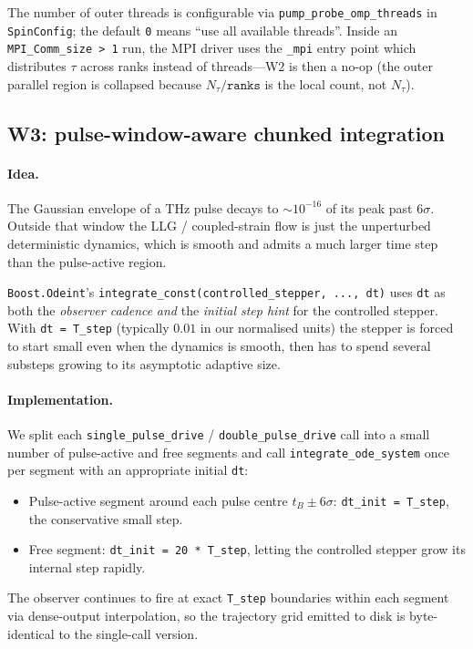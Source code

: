 \documentclass[11pt,letterpaper]{article}
\begin{document}
The number of outer threads is configurable via
\texttt{pump\_probe\_omp\_threads} in \texttt{SpinConfig}; the
default \texttt{0} means ``use all available threads''.  Inside an
\texttt{MPI\_Comm\_size > 1} run, the MPI driver uses the
\texttt{\_mpi} entry point which distributes $\tau$ across ranks
instead of threads---W2 is then a no-op (the outer parallel region
is collapsed because $N_\tau / \texttt{ranks}$ is the local count,
not $N_\tau$).

\subsection{W3: pulse-window-aware chunked integration}
\label{sec:w3}

\paragraph{Idea.}  The Gaussian envelope of a THz pulse decays to
$\sim 10^{-16}$ of its peak past $6\sigma$.  Outside that window
the LLG / coupled-strain flow is just the unperturbed deterministic
dynamics, which is smooth and admits a much larger time step than
the pulse-active region.

\texttt{Boost.Odeint}'s \texttt{integrate\_const(controlled\_stepper,
..., dt)} uses \texttt{dt} as both the \emph{observer cadence}
\emph{and} the \emph{initial step hint} for the controlled stepper.
With \texttt{dt = T\_step} (typically $0.01$ in our normalised
units) the stepper is forced to start small even when the dynamics
is smooth, then has to spend several substeps growing to its
asymptotic adaptive size.

\paragraph{Implementation.}  We split each
\texttt{single\_pulse\_drive} / \texttt{double\_pulse\_drive} call
into a small number of pulse-active and free segments and call
\texttt{integrate\_ode\_system} once per segment with an
appropriate initial \texttt{dt}:
\begin{itemize}[noitemsep]
  \item Pulse-active segment around each pulse centre $t_B \pm
        6\sigma$: \texttt{dt\_init = T\_step}, the conservative
        small step.
  \item Free segment: \texttt{dt\_init = 20 * T\_step}, letting
        the controlled stepper grow its internal step rapidly.
\end{itemize}
The observer continues to fire at exact \texttt{T\_step} boundaries
within each segment via dense-output interpolation, so the
trajectory grid emitted to disk is byte-identical to the
single-call version.
\end{document}
